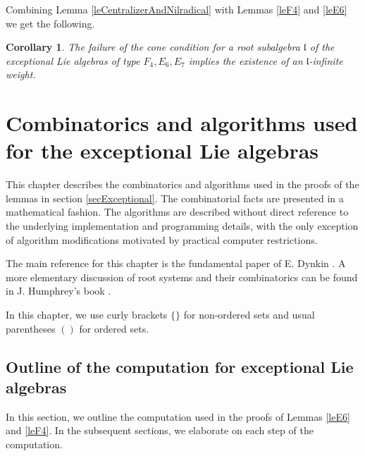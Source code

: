 \documentclass[12pt]{report}
\newtheorem{corollary}[theo]{Corollary}
\newcommand{\kk}{\mathfrak{k}}
\newcommand{\nn}{\mathfrak{n}}
\newcommand{\gG}{\mathfrak{g}}
\newcommand{\lL}{\mathfrak{l}}
\newcommand{\refle}[1]{Lemma \ref{#1}}
\newcommand{\refeq}[1]{(\ref{#1})}
\def\crplus{\hbox{$\supset${\raise1.05pt\hbox{\kern -0.60em ${\scriptscriptstyle +}$}}\ }}
\begin{document}

Combining \refle{leCentralizerAndNilradical} with Lemmas \ref{leF4} and \ref{leE6} we get the following.

\begin{corollary}\label{corExceptional}
The failure of the cone condition for a root subalgebra $\lL$ of the exceptional Lie algebras of type $F_4, E_6, E_7$ implies the existence of an $\lL$-infinite weight.
\end{corollary} 







\chapter{Combinatorics and algorithms used for the exceptional Lie algebras}\label{secComputerProof}\label{chapterComputer}
This chapter describes the combinatorics and algorithms used in the proofs of the lemmas in section \ref{secExceptional}. The combinatorial facts are presented in a mathematical fashion. The algorithms are described without direct reference to the underlying implementation and programming details, with the only exception of algorithm modifications motivated by practical computer restrictions.

The main reference for this chapter is the fundamental paper of E. Dynkin \cite{Dynkin:Semisimple}. A more elementary discussion of root systems and their combinatorics can be found in J. Humphrey's book \cite{Humphreys}.

In this chapter, we use curly brackets $\{\}$ for non-ordered sets and usual parentheses $()$ for ordered sets.
\section{Outline of the computation for exceptional Lie algebras}\label{secComputationOutline}
In this section, we outline the computation used in the proofs of Lemmas \ref{leE6} and \ref{leF4}. In the subsequent sections, we elaborate on each step of the computation.
\end{document}
